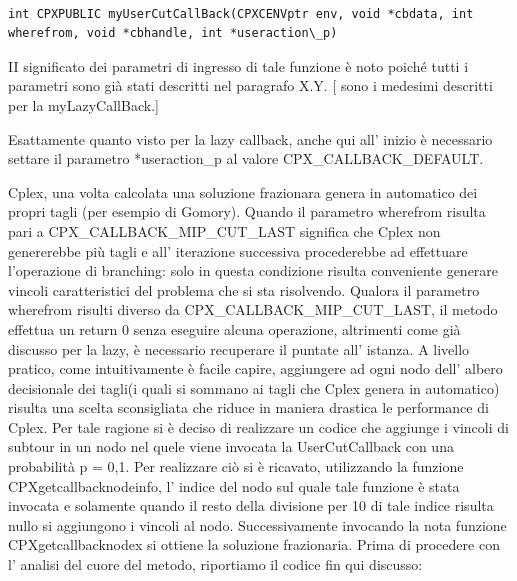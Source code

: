 \documentclass[11pt]{article}
\begin{document}
\begin{lstlisting}

int CPXPUBLIC myUserCutCallBack(CPXCENVptr env, void *cbdata, int wherefrom, void *cbhandle, int *useraction\_p)

\end{lstlisting}

II significato dei parametri di ingresso di tale funzione è noto poiché tutti i parametri sono già stati descritti nel paragrafo X.Y. [ sono i medesimi descritti per la myLazyCallBack.]


Esattamente quanto visto per la lazy callback, anche qui all' inizio è necessario settare il parametro *useraction\_p al valore CPX\_CALLBACK\_DEFAULT. 


Cplex, una volta calcolata una soluzione frazionara genera in automatico dei propri tagli (per esempio di Gomory). Quando il parametro wherefrom risulta pari a CPX\_CALLBACK\_MIP\_CUT\_LAST significa che Cplex non genererebbe più tagli e all’ iterazione successiva procederebbe ad effettuare l’operazione di branching: solo in questa condizione risulta conveniente generare vincoli caratteristici del problema che si sta risolvendo. Qualora il parametro wherefrom risulti diverso da CPX\_CALLBACK\_MIP\_CUT\_LAST, il metodo effettua un return 0 senza eseguire alcuna operazione, altrimenti come già discusso per la lazy, è necessario recuperare il puntate all’ istanza.
A livello pratico, come intuitivamente è facile capire, aggiungere ad ogni nodo dell’ albero decisionale dei tagli(i quali si sommano ai tagli che Cplex genera in automatico) risulta una scelta sconsigliata che riduce in maniera drastica le performance di Cplex. Per tale ragione si è deciso di realizzare un codice che aggiunge i vincoli di subtour in un nodo nel quele viene invocata la UserCutCallback con una probabilità p = 0,1. Per realizzare ciò si è ricavato, utilizzando la funzione CPXgetcallbacknodeinfo, l’ indice del nodo sul quale tale funzione è stata invocata e solamente quando il resto della divisione per 10 di tale indice risulta nullo si aggiungono i vincoli al nodo. Successivamente invocando la nota funzione CPXgetcallbacknodex si ottiene la soluzione frazionaria. Prima di procedere con l’ analisi del cuore del metodo, riportiamo il codice fin qui discusso:
\end{document}
